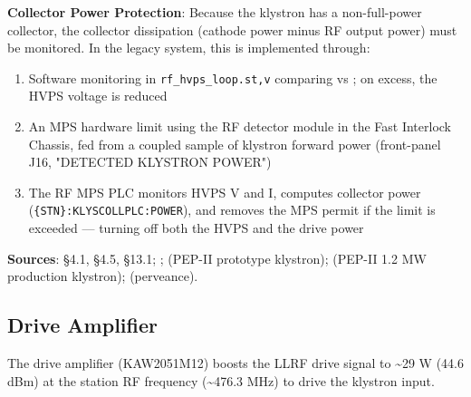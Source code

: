 \textbf{Collector Power Protection}: Because the klystron has a non-full-power collector, the collector dissipation (cathode power minus RF output power) must be monitored. In the legacy system, this is implemented through:

\begin{enumerate}
\def\labelenumi{\arabic{enumi}.}
\tightlist
\item
  Software monitoring in \texttt{rf\_hvps\_loop.st,v} comparing  vs ; on excess, the HVPS voltage is reduced
\item
  An MPS hardware limit using the RF detector module in the Fast Interlock Chassis, fed from a coupled sample of klystron forward power (front-panel J16, "DETECTED KLYSTRON POWER")
\item
  The RF MPS PLC monitors HVPS V and I, computes collector power (\texttt{\{STN\}:KLYSCOLLPLC:POWER}), and removes the MPS permit if the limit is exceeded --- turning off both the HVPS and the drive power
\end{enumerate}



\begin{keynote}
\textbf{Sources}:  §4.1, §4.5, §13.1; ;  (PEP-II prototype klystron);  (PEP-II 1.2 MW production klystron);  (perveance).
\end{keynote}

\subsection{Drive Amplifier}

The drive amplifier (KAW2051M12) boosts the LLRF drive signal to \textasciitilde29 W (44.6 dBm) at the station RF frequency (\textasciitilde476.3 MHz) to drive the klystron input.

